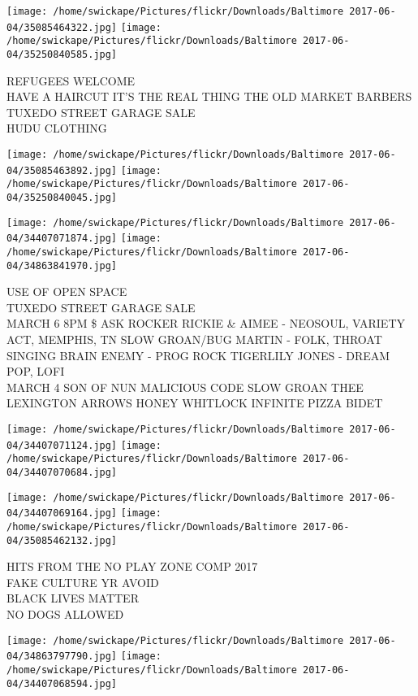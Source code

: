 \documentclass[10pt,letterpaper]{article}
\begin{document}
\texttt{[image: /home/swickape/Pictures/flickr/Downloads/Baltimore 2017-06-04/35085464322.jpg]}
\texttt{[image: /home/swickape/Pictures/flickr/Downloads/Baltimore 2017-06-04/35250840585.jpg]}

REFUGEES WELCOME\\
HAVE A HAIRCUT IT'S THE REAL THING THE OLD MARKET BARBERS\\
TUXEDO STREET GARAGE SALE\\
HUDU CLOTHING
\pagebreak

\texttt{[image: /home/swickape/Pictures/flickr/Downloads/Baltimore 2017-06-04/35085463892.jpg]}
\texttt{[image: /home/swickape/Pictures/flickr/Downloads/Baltimore 2017-06-04/35250840045.jpg]}

\texttt{[image: /home/swickape/Pictures/flickr/Downloads/Baltimore 2017-06-04/34407071874.jpg]}
\texttt{[image: /home/swickape/Pictures/flickr/Downloads/Baltimore 2017-06-04/34863841970.jpg]}

USE OF OPEN SPACE\\
TUXEDO STREET GARAGE SALE\\
MARCH 6 8PM \$ ASK ROCKER RICKIE \& AIMEE {-} NEOSOUL, VARIETY ACT, MEMPHIS, TN SLOW GROAN/BUG MARTIN {-} FOLK, THROAT SINGING BRAIN ENEMY {-} PROG ROCK TIGERLILY JONES {-} DREAM POP, LOFI\\
MARCH 4 SON OF NUN MALICIOUS CODE SLOW GROAN THEE LEXINGTON ARROWS HONEY WHITLOCK INFINITE PIZZA BIDET
\pagebreak

\texttt{[image: /home/swickape/Pictures/flickr/Downloads/Baltimore 2017-06-04/34407071124.jpg]}
\texttt{[image: /home/swickape/Pictures/flickr/Downloads/Baltimore 2017-06-04/34407070684.jpg]}

\texttt{[image: /home/swickape/Pictures/flickr/Downloads/Baltimore 2017-06-04/34407069164.jpg]}
\texttt{[image: /home/swickape/Pictures/flickr/Downloads/Baltimore 2017-06-04/35085462132.jpg]}

HITS FROM THE NO PLAY ZONE COMP 2017\\
FAKE CULTURE YR AVOID\\
BLACK LIVES MATTER\\
NO DOGS ALLOWED
\pagebreak

\texttt{[image: /home/swickape/Pictures/flickr/Downloads/Baltimore 2017-06-04/34863797790.jpg]}
\texttt{[image: /home/swickape/Pictures/flickr/Downloads/Baltimore 2017-06-04/34407068594.jpg]}
\end{document}

